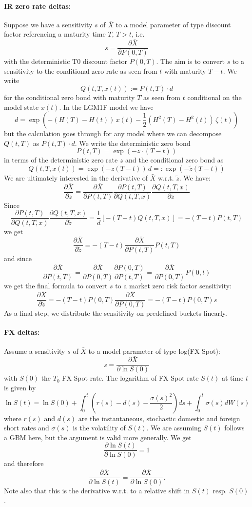 \documentclass[11pt,a4paper,oneside]{article}
\begin{document}
\noindent\paragraph{IR zero rate deltas:}
Suppose we have a sensitivity $s$ of $\bar{X}$ to a model parameter of type discount factor referencing a maturity time $T$, $T > t$, i.e.
$$
s = \frac{\partial\bar{X}}{\partial P(0,T)}
$$
with the deterministic T0 discount factor $P(0,T)$. The aim is to convert $s$ to a sensitivity to the conditional zero
rate as seen from $t$ with maturity $T-t$. We write
$$
Q(t,T,x(t)) := P(t,T) \cdot d
$$
for the conditional zero bond with maturity $T$ as seen from $t$ conditional on the model state $x(t)$. In the LGM1F
model we have
$$
d = \exp\left(-(H(T)-H(t))\,x(t) - \frac{1}{2}( H^2(T) - H^2(t) )\, \zeta(t) \right)
$$
but the calculation goes through for any model where we can decompose $Q(t,T)$ as $P(t,T)\cdot d$. We write the deterministic zero bond
$$
P(t,T) = \exp\left(-z\cdot(T-t)\right)
$$
in terms of the deterministic zero rate $z$ and the conditional zero bond as
$$
Q(t,T,x(t)) = \exp\left(-z (T-t)\right) \,d =: \exp\left(-\tilde{z} (T-t)\right)
$$
We are ultimately interested in the derivative of $\bar{X}$ w.r.t. $\tilde{z}$. We have:
$$
\frac{\partial \bar{X}}{\partial{\tilde{z}}} = \frac{\partial \bar{X}}{\partial P(t,T)} \frac{\partial P(t,T)}{\partial Q(t,T,x)} \frac{\partial Q(t,T,x)}{\partial \tilde{z}}
$$
Since
$$
\frac{\partial P(t,T)}{\partial Q(t,T,x)} \frac{\partial Q(t,T,x)}{\partial \tilde{z}} = \frac{1}{d} \left[ -(T-t) Q(t,T,x) \right] = -(T-t)P(t,T)
$$
we get
$$
\frac{\partial \bar{X}}{\partial{\tilde{z}}} = -(T-t) \frac{\partial \bar{X}}{\partial P(t,T)} P(t,T)
$$
and since
$$
\frac{\partial \bar{X}}{\partial P(t,T)} = \frac{\partial \bar{X}}{\partial P(0,T)} \frac{\partial P(0,T)}{\partial P(t,T)} =  \frac{\partial \bar{X}}{\partial P(0,T)} P(0,t)
$$
we get the final formula to convert $s$ to a market zero risk factor sensitivity:
$$
\frac{\partial \bar{X}}{\partial{\tilde{z}}} = -(T-t) P(0,T) \frac{\partial \bar{X}}{\partial P(0,T)} = -(T-t) P(0,T) s
$$
As a final step, we distribute the sensitivity on predefined buckets linearly.

\noindent\paragraph{FX deltas:}
Assume a sensitivity $s$ of $\bar{X}$ to a model parameter of type log(FX Spot):
$$
s = \frac{\partial\bar{X}}{\partial \ln S(0)}
$$
with $S(0)$ the $T_0$ FX Spot rate. The logarithm of FX Spot rate $S(t)$ at time $t$ is given by
$$
\ln S(t) = \ln S(0) + \int_0^t \left( r(s) - d(s) - \frac{\sigma(s)^2}{2} \right) ds + \int_0^t \sigma(s) dW(s)
$$
where $r(s)$ and $d(s)$ are the instantaneous, stochastic domestic and foreign short rates and $\sigma(s)$ is the
volatility of $S(t)$. We are assuming $S(t)$ follows a GBM here, but the argument is valid more generally. We get
$$
\frac{\partial \ln S(t)}{\partial \ln S(0)} = 1
$$
and therefore
$$
\frac{\partial \bar{X}}{\partial \ln S(t)} = \frac{\partial \bar{X}}{\partial \ln S(0)}.
$$
Note also that this is the derivative w.r.t. to a relative shift in $S(t)$ resp. $S(0)$.
\end{document}
